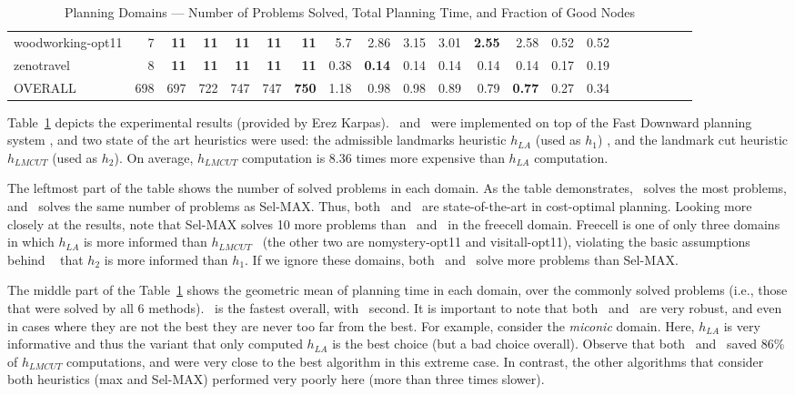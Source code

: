 \begin{table}[h!]
{\begin{tabular}{|l|r|r|r|r|r|r||r|r|r|r|r|r||r|r|r|r|r|r||r|r|}
woodworking-opt11 & 7 & \textbf{11} & \textbf{11} & \textbf{11} & \textbf{11} & \textbf{11} & 5.7 & 2.86 & 3.15 & 3.01 & \textbf{2.55} & 2.58 & 0.52 & 0.52 \\
zenotravel & 8 & \textbf{11} & \textbf{11} & \textbf{11} & \textbf{11} & \textbf{11} & 0.38 & \textbf{0.14} & 0.14 & 0.14 & 0.14 & 0.14 & 0.17 & 0.19 \\
\hline
OVERALL & 698 & 697 & 722 & 747 & 747 & \textbf{750} & 1.18 & 0.98 & 0.98 & 0.89 & 0.79 & \textbf{0.77} & 0.27 & 0.34 \\
\hline
\end{tabular}
}
\begin{small}
\caption{\label{tbl:rla-planning} Planning Domains --- Number of Problems
Solved, Total Planning Time, and Fraction of Good Nodes}
\end{small}
\end{table}

Table~\ref{tbl:rla-planning} depicts the experimental results
(provided by Erez Karpas). \lazyastar~and \rationallazyastar~were
implemented on top of the Fast Downward
planning system \cite{helmert:jair-2006}, and two state
of the art heuristics were used: the admissible landmarks heuristic $h_{LA}$ (used as $h_1$)
\cite{karpas-domshlak:ijcai-2009}, and the landmark cut heuristic $h_{LMCUT}$
\cite{helmert-domshlak:icaps-2009} (used as $h_2$).
On average, $h_{LMCUT}$ computation is 8.36 times more expensive than $h_{LA}$
computation.

The leftmost part of the table shows the number of solved problems in each
domain. As the table demonstrates, \rationallazyastar~solves the most problems,
and \lazyastar~solves the same number of problems as Sel-MAX. Thus, both
\lazyastar~and \rationallazyastar~are state-of-the-art in cost-optimal planning.
Looking more closely at the results, note that Sel-MAX
solves 10 more problems than \lazyastar~and \rationallazyastar~in the freecell
domain. Freecell is one of only three domains in which $h_{LA}$ is more
informed than $h_{LMCUT}$ ~(the other two are nomystery-opt11 and
visitall-opt11), violating the basic assumptions behind 
\lazyastar~ that $h_2$ is more informed than $h_1$. If
we ignore these domains, both \lazyastar~and \rationallazyastar~solve more
problems than Sel-MAX.

The middle part of the Table~\ref{tbl:rla-planning} shows the geometric mean of
planning time in each domain, over the commonly solved problems (i.e., those
that were solved by all 6 methods). \rationallazyastar~is the fastest overall,
with \lazyastar~second. It is important to note that both \lazyastar~and
\rationallazyastar~are very robust, and even in cases where they are not the
best they are never too far from the best. For example, consider the {\em
miconic} domain. Here,  $h_{LA}$ is very informative and thus the variant that
only computed $h_{LA}$ is the best choice (but a bad choice overall). Observe
that both  \lazyastar~and \rationallazyastar~saved 86\% of $h_{LMCUT}$
computations, and were very close to the best algorithm in this extreme case.
In contrast, the other algorithms that consider both heuristics (max and
Sel-MAX) performed very poorly here (more than three times slower).

